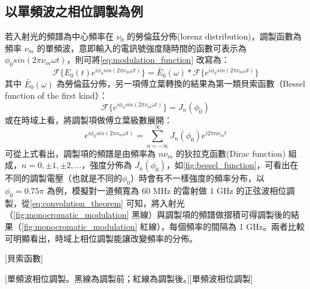 \documentclass[class=NCU_thesis, crop=false]{standalone}
\begin{document}
\subsection{以單頻波之相位調製為例}
若入射光的頻譜為中心頻率在 $\nu_{0}$ 的勞倫茲分佈(lorenz distribution)，調製函數為頻率 $\nu_{m}$ 的單頻波，意即輸入的電訊號強度隨時間的函數可表示為 $\phi_{0} sin(2\pi \nu_{m} \omega t)$，則可將\cref{eq:modulation_function} 改寫為：
\begin{equation}
\label{eq:convolution_theorem}
    \mathscr{F}\{E_{0}(t)e^{i\phi_{0} sin(2\pi \nu_{m} \omega t)}\}=\tilde{E_{0}}(\omega)*\mathscr{F}\{{e^{i\phi_{0} sin(2\pi \nu_{m} \omega t)}}\}
\end{equation}
其中 $\tilde{E_{0}}(\omega)$ 為勞倫茲分佈，另一項傅立葉轉換的結果為第一類貝索函數（Bessel function of the first kind）：
\begin{equation}
    \mathscr{F}\{{e^{i\phi_{0} sin(2\pi \nu_{m} \omega t)}}\}=J_{n}(\phi_{0})
\end{equation}
或在時域上看，將調製項做傅立葉級數展開：
\begin{equation}
    e^{i\phi_{0} sin(2\pi \nu_{m} \omega t)}=\sum_{n=-\infty}^{\infty}J_{n}(\phi_{0})e^{i 2 \pi n \nu_{m} t}
\end{equation}
可從上式看出，調製項的頻譜是由頻率為 $n \nu_{m}$ 的狄拉克函數(Dirac function) 組成，$n=0, \pm1, \pm2, ...$，強度分佈為 $J_{n}(\phi_{0})$，如\cref{fig:bessel_function}，可看出在不同的調製電壓（也就是不同的$\phi_{0}$）時會有不一樣強度的頻率分布，以 $\phi_{0}=0.75\pi$ 為例，模擬對一道頻寬為 60 MHz 的雷射做 1 GHz 的正弦波相位調製，從\cref{eq:convolution_theorem} 可知，將入射光（\cref{fig:monocromatic_modulation} 黑線）與調製項的頻譜做摺積可得調製後的結果（\cref{fig:monocromatic_modulation} 紅線），每個頻率的間隔為 1 GHz。兩者比較可明顯看出，時域上相位調製能讓改變頻率的分佈。

[貝索函數]

[單頻波相位調製。黑線為調製前；紅線為調製後。][單頻波相位調製]
\end{document}
